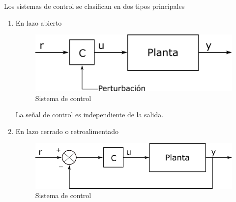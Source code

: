 Los sistemas de control se clasifican en dos tipos principales
\begin{enumerate}

    \item En lazo abierto \\
        \begin{figure}[h!]
            \centering
                \includegraphics[scale=0.25]{Control de Sistemas Mecatronicos Figuras/06 Lazo Abierto.png}
            \caption{Sistema de control}
        \end{figure}
    La señal de control es independiente de la salida.
    
    \item En lazo cerrado o retroalimentado
        \begin{figure}[h!]
            \centering
                \includegraphics[scale=0.25]{Control de Sistemas Mecatronicos Figuras/07 Lazo Cerrado.png}
            \caption{Sistema de control}
        \end{figure}
\end{enumerate}